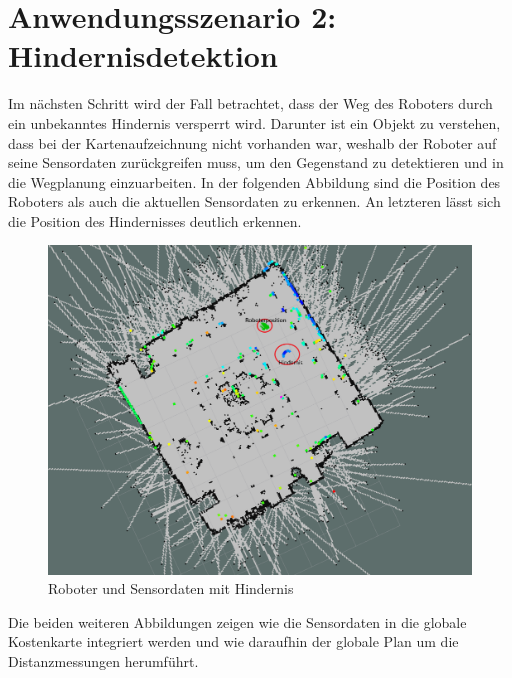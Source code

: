 \section{Anwendungsszenario 2: Hindernisdetektion}
Im nächsten Schritt wird der Fall betrachtet, dass der Weg des Roboters durch ein unbekanntes Hindernis versperrt wird. Darunter ist ein Objekt zu verstehen, dass bei der Kartenaufzeichnung nicht vorhanden war, weshalb der Roboter auf seine Sensordaten zurückgreifen muss, um den Gegenstand zu detektieren und in die Wegplanung einzuarbeiten. In der folgenden Abbildung sind die Position des Roboters als auch die aktuellen Sensordaten zu erkennen. An letzteren lässt sich die Position des Hindernisses deutlich erkennen.
\begin{figure}[!ht]
\centering
\includegraphics[scale=0.9,trim={13cm 13cm 9cm 2cm},clip]{img/Experiment2_Laserscan_Hindernis.png}
\caption{Roboter und Sensordaten mit Hindernis}
\end{figure}
\newpage
Die beiden weiteren Abbildungen zeigen wie die Sensordaten in die globale Kostenkarte integriert werden und wie daraufhin der globale Plan um die Distanzmessungen herumführt.
